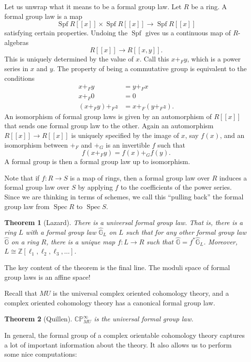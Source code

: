 \documentclass{shortart}
\newtheorem{thm}{Theorem}[section]
\theoremstyle{definition}
\DeclareMathOperator\Spec{Spec}
\DeclareMathOperator\Spf{Spf}
\newcommand\G{\mathbb{G}}
\newcommand\Z{\mathbb{Z}}
\newcommand\CP{\mathbb{CP}}
\begin{document}
Let us unwrap what it means to be a formal group law. Let $R$ be a ring. A formal group law is a map
\[
  \Spf R[\![x]\!] \times \Spf R[\![x]\!] \to \Spf R[\![x]\!]
\]
satisfying certain properties. Undoing the $\Spf$ gives us a continuous map of $R$-algebras
\[
  R[\![x]\!] \to R[\![x, y]\!].
\]
This is uniquely determined by the value of $x$. Call this $x +_F y$, which is a power series in $x$ and $y$. The property of being a commutative group is equivalent to the conditions
\[
  \begin{aligned}
    x +_F y &= y +_F x\\
    x +_F 0 &= 0\\
    (x +_F y) +_F z &= x +_F (y +_F z).
  \end{aligned}
\]
An isomorphism of formal group laws is given by an automorphism of $R[\![x]\!]$ that sends one formal group law to the other. Again an automorphism $R[\![x]\!] \to R[\![x]\!]$ is uniquely specified by the image of $x$, say $f(x)$, and an isomorphism between $+_F$ and $+_G$ is an invertible $f$ such that
\[
  f(x +_F y) = f(x) +_G f(y).
\]
A formal group is then a formal group law up to isomorphism.

Note that if $f: R \to S$ is a map of rings, then a formal group law over $R$ induces a formal group law over $S$ by applying $f$ to the coefficients of the power series. Since we are thinking in terms of schemes, we call this ``pulling back'' the formal group law from $\Spec R$ to $\Spec S$.

\begin{thm}[Lazard]
  There is a universal formal group law. That is, there is a ring $L$ with a formal group law $\hat{\G}_L$ on $L$ such that for any other formal group law $\hat{\G}$ on a ring $R$, there is a unique map $f: L \to R$ such that $\hat{\G} = f^* \hat{\G}_L$. Moreover, $L \cong \Z[\ell_1, \ell_2, \ell_3, \ldots]$.
\end{thm}
The key content of the theorem is the final line. The moduli space of formal group laws is an affine space!

Recall that $MU$ is the universal complex oriented cohomology theory, and a complex oriented cohomology theory has a canonical formal group law.
\begin{thm}[Quillen]
  $\CP^\infty_{MU}$ is the universal formal group law.
\end{thm}

In general, the formal group of a complex orientable cohomology theory captures a lot of important information about the theory. It also allows us to perform some nice computations:
\end{document}

